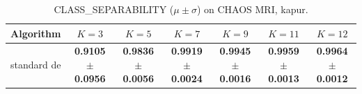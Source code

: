 \begin{table}[htbp]
\centering
\caption{CLASS_SEPARABILITY ($\mu \pm \sigma$) on CHAOS MRI, kapur.}
\label{tab:exp2-kapur-class_separability}
\begin{tabular}{lcccccc}
\toprule
Algorithm & $K=3$ & $K=5$ & $K=7$ & $K=9$ & $K=11$ & $K=12$ \\
\midrule
standard de & \textbf{0.9105 $\pm$ 0.0956} & \textbf{0.9836 $\pm$ 0.0056} & \textbf{0.9919 $\pm$ 0.0024} & \textbf{0.9945 $\pm$ 0.0016} & \textbf{0.9959 $\pm$ 0.0013} & \textbf{0.9964 $\pm$ 0.0012} \\
\bottomrule
\end{tabular}
\end{table}